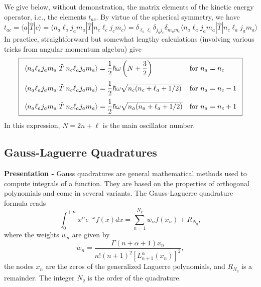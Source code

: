 \documentclass[letterpaper,12pt]{article}
\begin{document}
We give below, without demonstration, the matrix elements of the kinetic 
energy operator, i.e., the elements $t_{ac}$. By virtue of the spherical 
symmetry, we have
\begin{equation}
t_{ac} 
= \langle a | \hat{T} | c \rangle 
= \langle n_{a} \ell_{a} j_{a} m_{a}| \hat{T} | n_{c} \ell_{c} j_{c} m_{c} \rangle
= \delta_{\ell_{a}\ell_{c}}\delta_{j_{a}j_{c}}\delta_{m_{a}m_{c}}
\langle n_{a} \ell_{a} j_{a} m_{a}| \hat{T} | n_{c} \ell_{a} j_{a} m_{a} \rangle
\end{equation}
In practice, straightforward but somewhat lengthy calculations (involving 
various tricks from angular momentum algebra) give
\begin{equation*}
\boxed{
\begin{array}{ll}
\langle n_{a} \ell_{a} j_{a} m_{a}| \hat{T} | n_{c} \ell_{a} j_{a} m_{a} \rangle
= \displaystyle
\frac{1}{2}\hbar\omega \left( N + \frac{3}{2} \right) 
& \text{for}\ n_{a} = n_{c} 
\medskip\\
\langle n_{a} \ell_{a} j_{a} m_{a} | \hat{T} | n_{c} \ell_{a} j_{a} m_{a} \rangle
= \displaystyle
\frac{1}{2}\hbar\omega
\sqrt{
n_{c}(n_{c} + \ell_{a} + 1/2)
     }
& \text{for}\ n_{a} = n_{c} - 1 
\medskip\\
\langle n_{a} \ell_{a} j_{a} m_{a}  | \hat{T} | n_{c} \ell_{a} j_{a} m_{a} \rangle
=\displaystyle
\frac{1}{2}\hbar\omega
\sqrt{
n_{a}(n_{a} + \ell_{a} + 1/2)
     }
& \text{for}\ n_{a} = n_{c} + 1
\end{array}
}
\end{equation*}
In this expression, $N = 2n + \ell$ is the main oscillator number.


\subsection{Gauss-Laguerre Quadratures}

{\bf Presentation - } Gauss quadratures are general mathematical methods used to compute integrals of a function. They are based on the properties of orthogonal polynomials and come in several variants. The Gauss-Laguerre quadrature formula reads
\begin{equation}
\int_{0}^{+\infty} x^{\alpha}e^{-x}f(x)dx = \sum_{n=1}^{N_{q}} w_{n}f(x_n) + R_{N_{q}},
\end{equation}
where the weights $w_{n}$ are given by
\begin{equation}
w_{n} = \frac{\Gamma(n+\alpha+1)x_{n}}{n!(n+1)^2\left[L_{n+1}^{\alpha}(x_{n})\right]^{2}},
\end{equation}
the nodes $x_n$ are the zeros of the generalized Laguerre polynomials, and $R_{N_{q}}$ is a remainder. The integer $N_{q}$ is the order of the quadrature.
\end{document}
